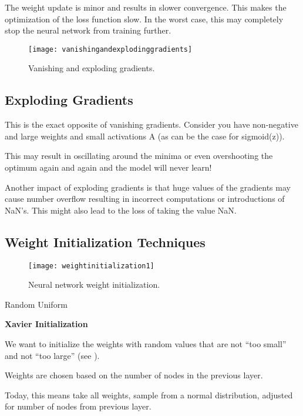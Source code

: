 The weight update is minor and results in slower convergence.  This makes the optimization of the loss function slow.  In the worst case, this may completely stop the neural network from training further.

 	\begin{figure}[htb]
		\centering
		\texttt{[image: vanishingandexplodinggradients]}
		\caption[Vanishing and exploding gradients]{Vanishing and exploding gradients.}
		\label{fig:vanishingandexplodinggradients}
	\end{figure}

	\subsection{Exploding Gradients}
This is the exact opposite of vanishing gradients.  Consider you have non-negative and large weights and small activations A (as can be the case for sigmoid(z)).

This may result in oscillating around the minima or even overshooting the optimum again and again and the model will never learn!

Another impact of exploding gradients is that huge values of the gradients may cause number overflow resulting in incorrect computations or introductions of NaN's.  This might also lead to the loss of taking the value NaN.

	\subsection{Weight Initialization Techniques}
 	\begin{figure}[htb]
		\centering
		\texttt{[image: weightinitialization1]}
		\caption[Neural network weight initialization]{Neural network weight initialization.}
		\label{fig:weightinitialization1}
	\end{figure}

	\begin{bulletedlist}
		\item Random Uniform
		\item {\bfseries Xavier Initialization}
		\begin{bulletedlist}
			\item We want to initialize the weights with random values that are not ``too small'' and not ``too large'' (see \figurename{}).
			\item Weights are chosen based on the number of nodes in the previous layer.
			\item Today, this means take all weights, sample from a normal distribution, adjusted for number of nodes from previous layer.
		\end{bulletedlist}
	\end{bulletedlist}

